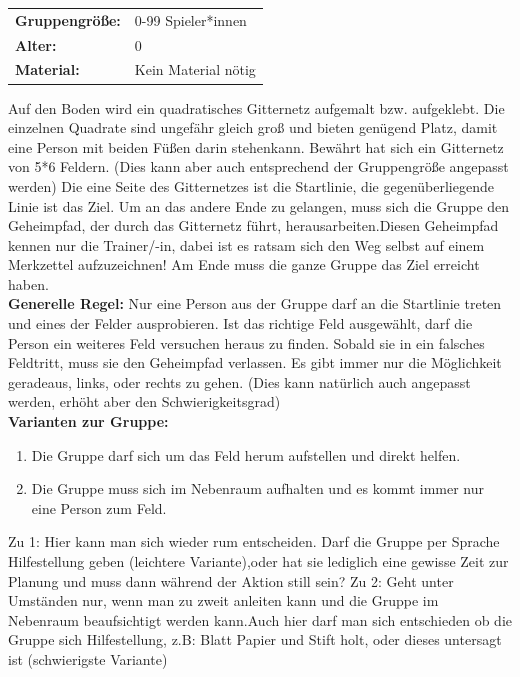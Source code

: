 
\begin{table}[H]
\begin{tabular}{>{\bfseries}lp{8cm}}
   Gruppengröße:   & 0-99 Spieler*innen\\
    Alter: & 0 \\
    Material: & Kein Material nötig \\ 
\end{tabular}
\end{table} 

Auf den Boden wird ein quadratisches Gitternetz aufgemalt bzw. aufgeklebt. Die einzelnen Quadrate sind 
ungefähr gleich groß und bieten genügend Platz, damit eine Person mit beiden Füßen darin stehenkann. Bewährt hat sich ein Gitternetz von 5*6 Feldern. (Dies kann aber auch entsprechend der Gruppengröße angepasst werden) Die eine Seite des Gitternetzes ist die Startlinie, die gegenüberliegende Linie ist das Ziel. Um an das andere Ende zu gelangen, muss sich die Gruppe den Geheimpfad, der durch das Gitternetz führt, herausarbeiten.Diesen Geheimpfad kennen nur die Trainer/-in, dabei ist es ratsam sich den Weg selbst auf einem Merkzettel aufzuzeichnen! Am Ende muss die ganze Gruppe das Ziel erreicht haben.\\

\textbf{Generelle Regel:}
Nur eine Person aus der Gruppe darf an die Startlinie treten und eines der Felder ausprobieren. Ist das richtige Feld ausgewählt, darf die Person ein weiteres Feld versuchen heraus zu finden. Sobald sie in ein falsches Feldtritt, muss sie den Geheimpfad verlassen. Es gibt immer nur die Möglichkeit geradeaus, links, oder rechts zu gehen. (Dies kann natürlich auch angepasst werden, erhöht aber den Schwierigkeitsgrad)\\

\textbf{Varianten zur Gruppe:}
\begin{enumerate}
    \item Die Gruppe darf sich um das Feld herum aufstellen und direkt helfen.
    \item  Die Gruppe muss sich im Nebenraum aufhalten und es kommt immer nur eine Person zum Feld.
\end{enumerate}
Zu 1: Hier kann man sich wieder rum entscheiden. Darf die Gruppe per Sprache Hilfestellung geben (leichtere Variante),oder hat sie lediglich eine gewisse Zeit zur Planung und muss dann während der Aktion still sein? Zu 2: Geht unter Umständen nur, wenn man zu zweit anleiten kann und die Gruppe im Nebenraum beaufsichtigt werden kann.Auch hier darf man sich entschieden ob die Gruppe sich Hilfestellung, z.B: Blatt Papier und Stift holt, oder dieses untersagt ist (schwierigste Variante)\\

